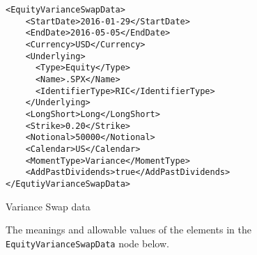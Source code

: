 \begin{listing}[H]
	\begin{verbatim}
<EquityVarianceSwapData>
    <StartDate>2016-01-29</StartDate>
    <EndDate>2016-05-05</EndDate>
    <Currency>USD</Currency>
    <Underlying>
      <Type>Equity</Type>
      <Name>.SPX</Name>
      <IdentifierType>RIC</IdentifierType>
    </Underlying>
    <LongShort>Long</LongShort>
    <Strike>0.20</Strike>
    <Notional>50000</Notional>
    <Calendar>US</Calendar>
    <MomentType>Variance</MomentType>
    <AddPastDividends>true</AddPastDividends>
</EqutiyVarianceSwapData>
    \end{verbatim}
    \caption{Variance Swap data}
	\label{lst:varswap_data}
\end{listing}

The meanings and allowable values of the elements in the \lstinline!EquityVarianceSwapData! node below.

